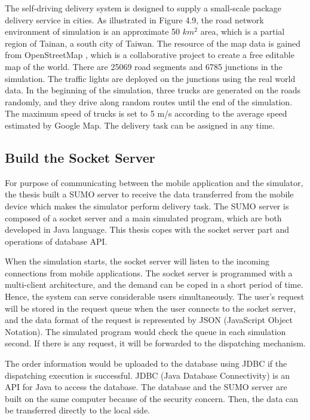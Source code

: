\documentclass[12pt]{ksthesis}
\begin{document}
\begin{thesis}
{The self-driving delivery system is designed to supply a small-scale package delivery service in cities. As illustrated in Figure 4.9, the road network environment of simulation is an approximate 50 $km^{2}$  area, which is a partial region of Tainan, a south city of Taiwan. The resource of the map data is gained from OpenStreetMap \cite{Haklay2008}, which is a collaborative project to create a free editable map of the world. There are 25069 road segments and 6785 junctions in the simulation. The traffic lights are deployed on the junctions using the real world data. In the beginning of the simulation, three trucks are generated on the roads randomly, and they drive along random routes until the end of the simulation. The maximum speed of trucks is set to 5 m/s according to the average speed estimated by Google Map. The delivery task can be assigned in any time.


\subsection{Build the Socket Server}
For purpose of communicating between the mobile application and the simulator, the thesis built a SUMO server to receive the data transferred from the mobile device which makes the simulator perform delivery task. The SUMO server is composed of a socket server and a main simulated program, which are both developed in Java language. This thesis copes with the socket server part and operations of database API.

When the simulation starts, the socket server will listen to the incoming connections from mobile applications. The socket server is programmed with a multi-client architecture, and the demand can be coped in a short period of time. Hence, the system can serve considerable users simultaneously. The user’s request will be stored in the request queue when the user connects to the socket server, and the data format of the request is represented by JSON (JavaScript Object Notation). The simulated program would check the queue in each simulation second. If there is any request, it will be forwarded to the dispatching mechanism. 

The order information would be uploaded to the database using JDBC if the dispatching execution is successful. JDBC (Java Database Connectivity) is an API for Java to access the database. The database and the SUMO server are built on the same computer because of the security concern. Then, the data can be transferred directly to the local side. 

}
\end{thesis}
\end{document}
